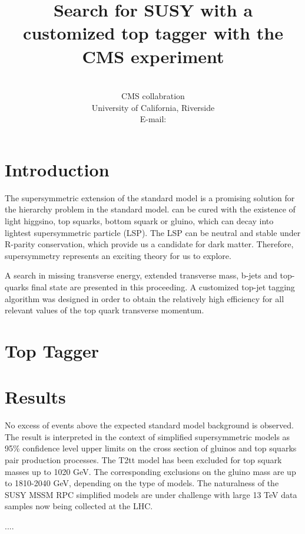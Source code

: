 \documentclass{PoS}
\title{Search for SUSY with a customized top tagger with the CMS experiment}
\author
{
  \speaker{Hua Wei}\\
  CMS collabration\\
  University of California, Riverside\\
  E-mail: \email{hua.wei@cern.ch}
}
\begin{document}
\section{Introduction}

The supersymmetric extension of the standard model is a promising solution for the hierarchy problem in the standard model. can be cured with the existence of light higgsino, top squarks, bottom squark or gluino, which can decay into lightest supersymmetric particle (LSP). The LSP can be neutral and stable under R-parity conservation, which provide us a candidate for dark matter. Therefore, supersymmetry represents an exciting theory for us to explore.

A search in missing transverse energy, extended transverse mass, b-jets and top-quarks final state are presented in this proceeding. A customized top-jet tagging algorithm was designed in order to obtain the relatively high efficiency for all relevant values of the top quark transverse momentum.

\section{Top Tagger}
\section{Results}

No excess of events above the expected standard model background is observed. The result is interpreted in the context of simplified supersymmetric models as 95\% confidence level upper limits on the cross section of gluinos and top squarks pair production processes. The T2tt model has been excluded for top squark masses up to 1020 GeV. The corresponding exclusions on the gluino mass are up to 1810-2040 GeV, depending on the type of models. The naturalness of the SUSY MSSM RPC simplified models are under challenge with large 13 TeV data samples now being collected at the LHC.

\begin{thebibliography}{99}
....

\end{thebibliography}
\end{document}
